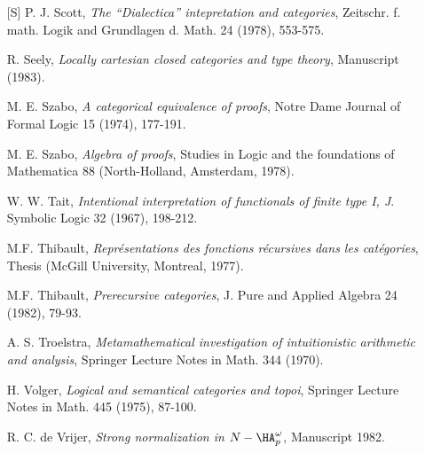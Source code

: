 \begin{enumerate}[leftmargin=*, widest=8888, align=left]
\item[{[S]}] P. J. Scott, {\em The ``Dialectica'' intepretation and categories}, Zeitschr.
f. math. Logik and Grundlagen d. Math. 24 (1978), 553-575.

\item[] R. Seely, {\em Locally cartesian closed categories and type theory}, Manuscript
(1983).

\item[] M. E. Szabo, {\em A categorical equivalence of proofs}, Notre Dame Journal of
Formal Logic 15 (1974), 177-191.

\item[] M. E. Szabo, {\em Algebra of proofs}, Studies in Logic and the foundations of
Mathematica 88 (North-Holland, Amsterdam, 1978).

\item[] W. W. Tait, {\em Intentional interpretation of functionals of finite type I, J}.
Symbolic Logic 32 (1967), 198-212.

\item[] M.F. Thibault, {\em Repr\'esentations des fonctions r\'ecursives dans les cat\'egories},
Thesis (McGill University, Montreal, 1977).

\item[] M.F. Thibault, {\em Prerecursive categories}, J. Pure and Applied Algebra 24 (1982), 79-93.

\item[] A. S. Troelstra, {\em Metamathematical investigation of intuitionistic arithmetic
and analysis}, Springer Lecture Notes in Math. 344 (1970).

\item[] H. Volger, {\em Logical and semantical categories and topoi}, Springer Lecture
Notes in Math. 445 (1975), 87-100.

\item[] R. C. de Vrijer, {\em Strong normalization in $N - \HA_{p}^{\omega}$}, Manuscript 1982.
\end{enumerate}


